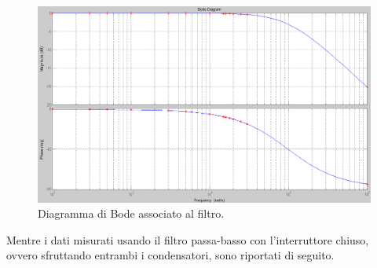 \documentclass[a4paper]{article}
\begin{document}
			\begin{figure}[h!]
				\centering
				\includegraphics[scale=0.4]{filtroPassaBassoUnCondensatoreBode}
				\caption{Diagramma di Bode associato al filtro.}
				\label{fig:filtroPassaBassoUnCondensatoreBode}
			\end{figure}
			Mentre i dati misurati usando il filtro passa-basso con l'interruttore chiuso, ovvero sfruttando entrambi i condensatori, sono riportati di seguito.
\end{document}
